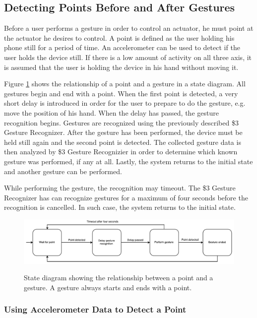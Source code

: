 \subsection{Detecting Points Before and After Gestures}

Before a user performs a gesture in order to control an actuator, he must point at the actuator he desires to control. A point is defined as the user holding his phone still for a period of time. An accelerometer can be used to detect if the user holds the device still. If there is a low amount of activity on all three axis, it is assumed that the user is holding the device in his hand without moving it.

Figure \ref{fig:gesture-recognition:point-to-gesture-state-diagram} shows the relationship of a point and a gesture in a state diagram. All gestures begin and end with a point. When the first point is detected, a very short delay is introduced in order for the user to prepare to do the gesture, e.g. move the position of his hand. When the delay has passed, the gesture recognition begins. Gestures are recognized using the previously described \$3 Gesture Recognizer. After the gesture has been performed, the device must be held still again and the second point is detected. The collected gesture data is then analyzed by \$3 Gesture Recognizier in order to determine which known gesture was performed, if any at all. Lastly, the system returns to the initial state and another gesture can be performed.

While performing the gesture, the recognition may timeout. The \$3 Gesture Recognizer has can recognize gestures for a maximum of four seconds before the recognition is cancelled. In such case, the system returns to the initial state.

\begin{figure}[h]
\centering
\includegraphics[width=\textwidth]{images/point-to-gesture-state-diagram}
\label{fig:gesture-recognition:point-to-gesture-state-diagram}
\caption{State diagram showing the relationship between a point and a gesture. A gesture always starts and ends with a point.}
\end{figure}

\subsubsection{Using Accelerometer Data to Detect a Point}

